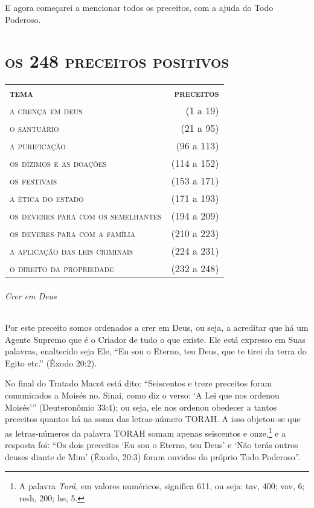 E agora começarei a mencionar todos os preceitos, com a ajuda do Todo
Poderoso.

\begingroup\makeatletter\@openrightfalse
\part{\textsc{os 248 preceitos positivos}}

\vspace*{\fill}
\thispagestyle{empty}
\begin{tabular}{lr}
\textbf{\textsc{tema}} & \textbf{\textsc{preceitos}} \\
\textsc{a crença em deus} & (1 a 19) \\
\textsc{o santuário} & (21 a 95) \\
\textsc{a purificação} & (96 a 113) \\
\textsc{os dízimos e as doações} & (114 a 152) \\
\textsc{os festivais} & (153 a 171) \\
\textsc{a ética do estado} & (171 a 193) \\
\textsc{os deveres para com os semelhantes} & (194 a 209) \\
\textsc{os deveres para com a família} & (210 a 223) \\
\textsc{a aplicação das leis criminais} & (224 a 231) \\
\textsc{o direito da propriedade} & (232 a 248)
\end{tabular}

\@openrighttrue\makeatother \endgroup

\pagebreak
\movetooddpage


\setcounter{paragraph}{0}
\setcounter{secnumdepth}{4}

\paragraph{Crer em Deus}

Por este preceito somos ordenados a crer em Deus, ou seja, a acreditar
que há um Agente Supremo que é o Criador de tudo o que existe. Ele está
expresso em Suas palavras, enaltecido seja Ele, ``Eu sou o Eterno, teu
Deus, que te tirei da terra do Egito etc.'' (Êxodo 20:2).

No final do Tratado Macot está dito: ``Seiscentos e treze preceitos
foram comunicados a Moisés no. Sinai, como diz o verso: `A Lei que nos
ordenou Moisés''' (Deuteronômio 33:4); ou seja, ele nos ordenou obedecer a
tantos preceitos quantos há na soma das letras-número TORAH. A isso
objetou-se que as letras-números da palavra TORAH somam apenas seiscentos e
onze,\footnote{A palavra \emph{Torá}, em valores numéricos, significa 611, ou
seja: tav, 400; vav, 6; resh, 200; he, 5.} e a resposta foi: ``Os dois preceitos `Eu sou o Eterno, teu Deus' e `Não terás outros
deuses diante de Mim' (Êxodo, 20:3) foram ouvidos do próprio Todo
Poderoso''.

